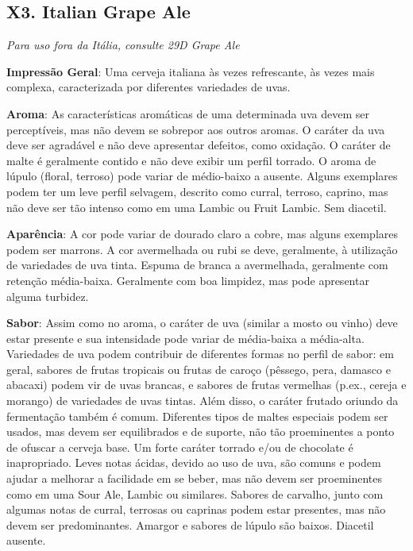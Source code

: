 \subsection*{X3. Italian Grape Ale}

\textit{Para uso fora da Itália, consulte 29D Grape Ale}

\textbf{Impressão Geral}: Uma cerveja italiana às vezes refrescante, às vezes mais complexa, caracterizada por diferentes variedades de uvas.

\textbf{Aroma}: As características aromáticas de uma determinada uva devem ser perceptíveis, mas não devem se sobrepor aos outros aromas. O caráter da uva deve ser agradável e não deve apresentar defeitos, como oxidação. O caráter de malte é geralmente contido e não deve exibir um perfil torrado. O aroma de lúpulo (floral, terroso) pode variar de médio-baixo a ausente. Alguns exemplares podem ter um leve perfil selvagem, descrito como curral, terroso, caprino, mas não deve ser tão intenso como em uma Lambic ou Fruit Lambic. Sem diacetil.

\textbf{Aparência}: A cor pode variar de dourado claro a cobre, mas alguns exemplares podem ser marrons. A cor avermelhada ou rubi se deve, geralmente, à utilização de variedades de uva tinta. Espuma de branca a avermelhada, geralmente com retenção média-baixa. Geralmente com boa limpidez, mas pode apresentar alguma turbidez.

\textbf{Sabor}: Assim como no aroma, o caráter de uva (similar a mosto ou vinho) deve estar presente e sua intensidade pode variar de média-baixa a média-alta. Variedades de uva podem contribuir de diferentes formas no perfil de sabor: em geral, sabores de frutas tropicais ou frutas de caroço (pêssego, pera, damasco e abacaxi) podem vir de uvas brancas, e sabores de frutas vermelhas (p.ex., cereja e morango) de variedades de uvas tintas. Além disso, o caráter frutado oriundo da fermentação também é comum. Diferentes tipos de maltes especiais podem ser usados, mas devem ser equilibrados e de suporte, não tão proeminentes a ponto de ofuscar a cerveja base. Um forte caráter torrado e/ou de chocolate é inapropriado. Leves notas ácidas, devido ao uso de uva, são comuns e podem ajudar a melhorar a facilidade em se beber, mas não devem ser proeminentes como em uma Sour Ale, Lambic ou similares. Sabores de carvalho, junto com algumas notas de curral, terrosas ou caprinas podem estar presentes, mas não devem ser predominantes. Amargor e sabores de lúpulo são baixos. Diacetil ausente.

